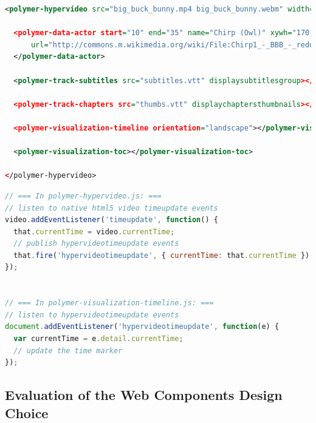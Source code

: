 \documentclass[runningheads,a4paper]{llncs}
\begin{document}
\begin{lstlisting}[caption={Web Components mark-up for the hypervideo in \autoref{fig:screenshot}, including subtitles, chapters, timeline, and table of contents; the actor annotation contains a~spatial fragment
(\texttt{xywh})~\cite{troncy2012mediafragments} and a~link (\texttt{url})
  to Wikimedia Commons},
  label=listing:polymer, language=xml,
  float=htb!, stringstyle=\color{gray},morekeywords={polymer,hypervideo,track,subtitles,chapters,toc,timeline,visualization,data,actor,src,end,start,name,url,width,height,muted,displaysubtitlesgroup,orientation,displaychaptersthumbnails,xywh}]
<polymer-hypervideo src="big_buck_bunny.mp4 big_buck_bunny.webm" width="400" height="225" muted>

  <polymer-data-actor start="10" end="35" name="Chirp (Owl)" xywh="170,20,70,80" 
      url="http://commons.m.wikimedia.org/wiki/File:Chirp1_-_BBB_-_reduced_snapshot.png">
  </polymer-data-actor>

  <polymer-track-subtitles src="subtitles.vtt" displaysubtitlesgroup></polymer-track-subtitles>

  <polymer-track-chapters src="thumbs.vtt" displaychaptersthumbnails></polymer-track-chapters>

  <polymer-visualization-timeline orientation="landscape"></polymer-visualization-timeline>

  <polymer-visualization-toc></polymer-visualization-toc>

</polymer-hypervideo>
\end{lstlisting}

\begin{lstlisting}[caption={Native JavaScript event communication
  between Web Components},
  label=listing:events, language=JavaScript,
  float=htb!, stringstyle=\color{gray},morekeywords={addEventListener,document}]
// === In polymer-hypervideo.js: ===
// listen to native html5 video timeupdate events
video.addEventListener('timeupdate', function() {
  that.currentTime = video.currentTime;
  // publish hypervideotimeupdate events
  that.fire('hypervideotimeupdate', { currentTime: that.currentTime });
});


// === In polymer-visualization-timeline.js: ===
// listen to hypervideotimeupdate events
document.addEventListener('hypervideotimeupdate', function(e) {
  var currentTime = e.detail.currentTime;
  // update the time marker
});
\end{lstlisting}

\subsection{Evaluation of the Web Components Design Choice}
\end{document}
